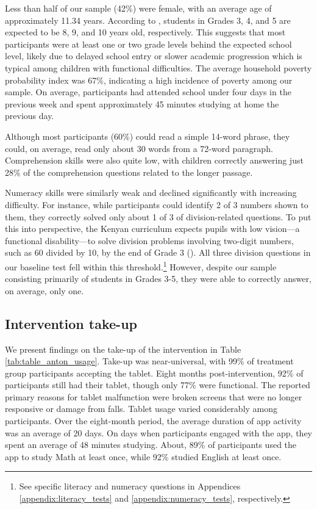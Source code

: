 \documentclass[hidelinks,12pt]{article}
\begin{document}
\begin{singlespace}
Less than half of our sample (42\%) were female, with an average age of approximately 11.34 years. According to \textcite{kenya_institute_of_curriculum_development_basic_2019}, students in Grades 3, 4, and 5 are expected to be 8, 9, and 10 years old, respectively. This suggests that most participants were at least one or two grade levels behind the expected school level, likely due to delayed school entry or slower academic progression which is typical among children with functional difficulties. The average household poverty probability index was 67\%, indicating a high incidence of poverty among our sample. On average, participants had attended school under four days in the previous week and spent approximately 45 minutes studying at home the previous day.

Although most participants (60\%) could read a simple 14-word phrase, they could, on average, read only about 30 words from a 72-word paragraph. Comprehension skills were also quite low, with children correctly answering just 28\% of the comprehension questions related to the longer passage.

Numeracy skills were similarly weak and declined significantly with increasing difficulty. For instance, while participants could identify 2 of 3 numbers shown to them, they correctly solved only about 1 of 3 of division-related questions. To put this into perspective, the Kenyan curriculum expects pupils with low vision—a functional disability—to solve division problems involving two-digit numbers, such as 60 divided by 10, by the end of Grade 3 (\cite{government_of_kenya_mathematics_2017}). All three division questions in our baseline test fell within this threshold.\footnote{See specific literacy and numeracy questions in Appendices \ref{appendix:literacy_tests} and \ref{appendix:numeracy_tests}, respectively.} However, despite our sample consisting primarily of students in Grades 3-5, they were able to correctly answer, on average, only one.

\subsection{Intervention take-up} %
We present findings on the take-up of the intervention in Table \ref{tab:table_anton_usage}. Take-up was near-universal, with 99\% of treatment group participants accepting the tablet. Eight months post-intervention, 92\% of participants still had their tablet, though only 77\% were functional. The reported primary reasons for tablet malfunction were broken screens that were no longer responsive or damage from falls. Tablet usage varied considerably among participants. Over the eight-month period, the average duration of app activity was an average of 20 days. On days when participants engaged with the app, they spent an average of 48 minutes studying. About, 89\% of participants used the app to study Math at least once, while 92\% studied English at least once.


\end{singlespace}
\end{document}

